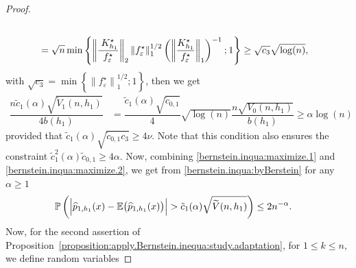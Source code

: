 \documentclass[11pt,a4paper,openany]{article}
\begin{document}
\begin{proof}
\begin{align*}
	\\  
	&=  \sqrt{n}      \min  \left\{    \left\| \dfrac{ \hspace{0.1cm}     K_{h_{1}}^{\star}    }{ f_{\varepsilon}^{\star} }   \right\|_{2}  \left\| f_{\varepsilon}^{\star} \right\|_{1}^{1/2}   \left( \left\| \dfrac{ K_{h_{1}}^{\star} }{ f_{\varepsilon}^{\star} } \right\|_{1}  \right)^{-1}     \hspace{0.01cm}   ;  \hspace{0.01cm}   1  \right\}  \geq  \sqrt{c_{3}}\sqrt{\log(n)} ,  
\end{align*}   
with $\sqrt{c_{3} }=  \min  \left\{     \left\| f_{\varepsilon}^{\star} \right\|_{1}^{1/2}; 1  \right\}$, then we get 
\begin{align}
	\dfrac{ n   \tilde c_{1}(\alpha) \sqrt{ \widetilde{V}_{1}(n , h_{1}) }  }{ 4 b(h_{1}) }  &=  \dfrac{ \tilde c_{1}(\alpha) \sqrt{\tilde c_{0,1}} }{4}  \sqrt{ \log(n) }  \dfrac{ n  \sqrt{ V_{0}(n , h_{1}) }}{ b(h_{1}) }    \geq  \alpha  \log(n) 
	\label{bernstein.inqua:maximize.2}
\end{align}   
provided that $\tilde c_{1}(\alpha) \sqrt{\tilde c_{0,1}  c_{3} }   \geq  4 \nu$. Note that this condition also ensures the constraint $\tilde c_{1}^2(\alpha) \tilde c_{0,1}  \geq 4 \alpha $.
Now, combining \eqref{bernstein.inqua:maximize.1} and \eqref{bernstein.inqua:maximize.2}, we get from \eqref{bernstein.inqua:byBerstein} for any $\alpha \geq 1$ 
\begin{align}
	\mathbb{P} \left( \Big| \widehat{p}_{1,h_{1}}(x) - \mathbb{E} \big( \widehat{p}_{1,h_{1}}(x) \big) \Big| > \tilde c_{1}(\alpha)  \sqrt{\widetilde{V}(n,h_{1})} \right)  \nonumber 
	&\leq 2 n^{-\alpha}.
	\label{proof:prop:apply.Bernstein.inequa:P(Omega_{1,n}^{c})}
\end{align}
	Now, for the second assertion of Proposition~\ref{proposition:apply.Bernstein.inequa:study.adaptation}, for $1 \leq k \leq n$, 
	we define random variables  

\end{proof}
\end{document}
